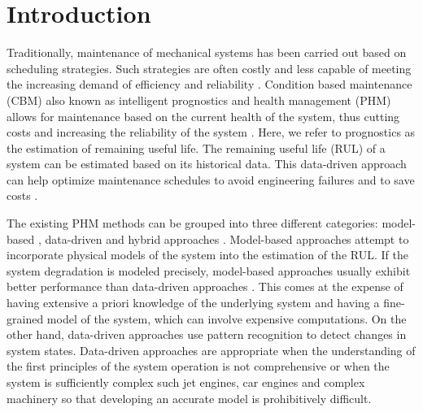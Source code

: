 \documentclass[12pt]{IEEEtran}%
\begin{document}
%



\section{Introduction}

\label{sec:rul_intro}

Traditionally, maintenance of mechanical systems has been carried out based on
scheduling strategies. Such strategies are often costly and less capable of
meeting the increasing demand of efficiency and reliability
\cite{Gebraeel2005, Zaidan2013}. Condition based maintenance (CBM) also known
as intelligent prognostics and health management (PHM) allows for maintenance
based on the current health of the system, thus cutting costs and increasing
the reliability of the system \cite{Zhao2017}. Here, we refer to prognostics
as the estimation of remaining useful life. The remaining useful life (RUL) of
a system can be estimated based on its historical data. This data-driven
approach can help optimize maintenance schedules to avoid engineering failures
and to save costs \cite{Lee2014}.

The existing PHM methods can be grouped into three different categories:
model-based \cite{Yu2001} , data-driven \cite{Liu2009, Mosallam2013} and
hybrid approaches \cite{Pecht2010, Liu2012}. Model-based approaches attempt to
incorporate physical models of the system into the estimation of the RUL. If
the system degradation is modeled precisely, model-based approaches usually
exhibit better performance than data-driven approaches \cite{Qian2017}. This
comes at the expense of having extensive a priori knowledge of the underlying
system and having a fine-grained model of the system, which can involve
expensive computations. On the other hand, data-driven approaches use pattern
recognition to detect changes in system states. Data-driven approaches are
appropriate when the understanding of the first principles of the system
operation is not comprehensive or when the system is sufficiently complex such
jet engines, car engines and complex machinery so that developing an accurate
model is prohibitively difficult.
\end{document}
